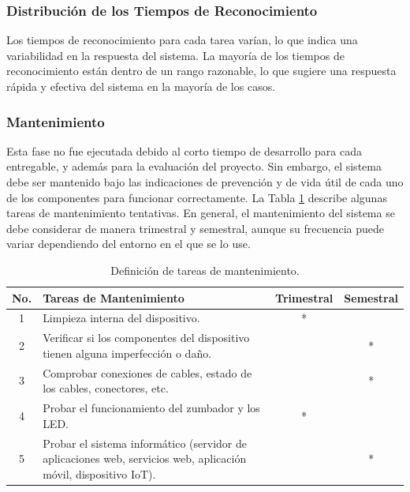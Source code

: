 \documentclass[a4paper,fleqn]{cas-sc}
\begin{document}
				\subsubsection*{Distribución de los Tiempos de Reconocimiento}
					Los tiempos de reconocimiento para cada tarea varían, lo que indica una variabilidad en la respuesta del sistema. La mayoría de los tiempos de reconocimiento están dentro de un rango razonable, lo que sugiere una respuesta rápida y efectiva del sistema en la mayoría de los casos.
			\subsubsection{Mantenimiento}
				Esta fase no fue ejecutada debido al corto tiempo de desarrollo para cada entregable, y además para la evaluación del proyecto. Sin embargo, el sistema debe ser mantenido bajo las indicaciones de prevención y de vida útil de cada uno de los componentes para funcionar correctamente. La Tabla \ref{tab:maintenance-tasks} describe algunas tareas de mantenimiento tentativas. En general, el mantenimiento del sistema se debe considerar de manera trimestral y semestral, aunque su frecuencia puede variar dependiendo del entorno en el que se lo use.
			
				\begin{table}[h]
					\centering
					\caption{Definición de tareas de mantenimiento.}
					\label{tab:maintenance-tasks}
					\begin{tabularx}{\textwidth}{cXcc}
						\toprule
						\textbf{No.} & \textbf{Tareas de Mantenimiento} & \textbf{Trimestral} & \textbf{Semestral} \\
						\midrule
						1 & Limpieza interna del dispositivo. & * & \\
						2 & Verificar si los componentes del dispositivo tienen alguna imperfección o daño. & & * \\
						3 & Comprobar conexiones de cables, estado de los cables, conectores, etc. & & * \\
						4 & Probar el funcionamiento del zumbador y los LED. & * & \\
						5 & Probar el sistema informático (servidor de aplicaciones web, servicios web, aplicación móvil, dispositivo IoT). & & * \\
						\bottomrule
					\end{tabularx}
				\end{table}
			
\end{document}
